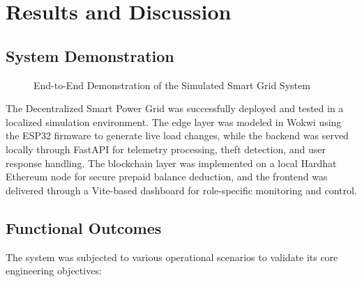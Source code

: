 \chapter{Results and Discussion}

\section{System Demonstration}

\begin{figure}[H]
\centering
{}
\caption{End-to-End Demonstration of the Simulated Smart Grid System}
\label{fig:system-demonstration}
\end{figure}

The Decentralized Smart Power Grid was successfully deployed and tested in a localized simulation environment. The edge layer was modeled in Wokwi using the ESP32 firmware to generate live load changes, while the backend was served locally through FastAPI for telemetry processing, theft detection, and user response handling. The blockchain layer was implemented on a local Hardhat Ethereum node for secure prepaid balance deduction, and the frontend was delivered through a Vite-based dashboard for role-specific monitoring and control.

\section{Functional Outcomes}

The system was subjected to various operational scenarios to validate its core engineering objectives:

